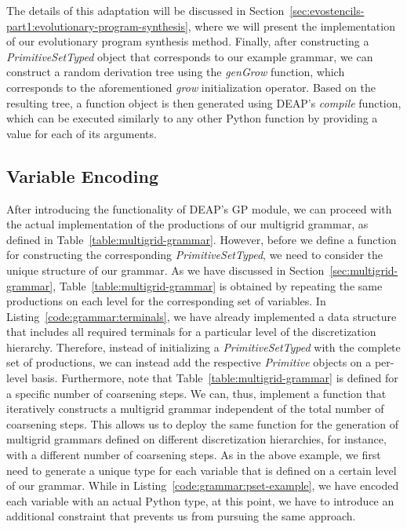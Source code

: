 The details of this adaptation will be discussed in Section~\ref{sec:evostencils-part1:evolutionary-program-synthesis}, where we will present the implementation of our evolutionary program synthesis method.
Finally, after constructing a \emph{PrimitiveSetTyped} object that corresponds to our example grammar, we can construct a random derivation tree using the \emph{genGrow} function, which corresponds to the aforementioned \emph{grow} initialization operator.
Based on the resulting tree, a function object is then generated using DEAP's \emph{compile} function, which can be executed similarly to any other Python function by providing a value for each of its arguments.

\subsection{Variable Encoding}
After introducing the functionality of DEAP's GP module, we can proceed with the actual implementation of the productions of our multigrid grammar, as defined in Table~\ref{table:multigrid-grammar}.
However, before we define a function for constructing the corresponding \emph{PrimitiveSetTyped}, we need to consider the unique structure of our grammar.
As we have discussed in Section~\ref{sec:multigrid-grammar}, Table~\ref{table:multigrid-grammar} is obtained by repeating the same productions on each level for the corresponding set of variables.
In Listing~\ref{code:grammar:terminals}, we have already implemented a data structure that includes all required terminals for a particular level of the discretization hierarchy.
Therefore, instead of initializing a \emph{PrimitiveSetTyped} with the complete set of productions, we can instead add the respective \emph{Primitive} objects on a per-level basis.
Furthermore, note that Table~\ref{table:multigrid-grammar} is defined for a specific number of coarsening steps.
We can, thus, implement a function that iteratively constructs a multigrid grammar independent of the total number of coarsening steps.
This allows us to deploy the same function for the generation of multigrid grammars defined on different discretization hierarchies, for instance, with a different number of coarsening steps.
As in the above example, we first need to generate a unique type for each variable that is defined on a certain level of our grammar.
While in Listing~\ref{code:grammar:pset-example}, we have encoded each variable with an actual Python type, at this point, we have to introduce an additional constraint that prevents us from pursuing the same approach.
